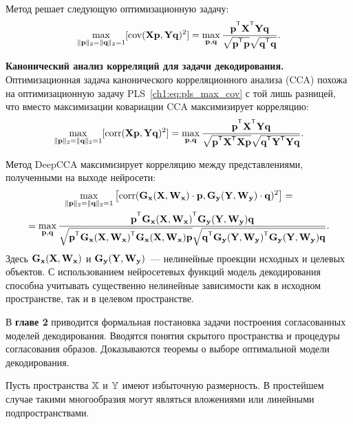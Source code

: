 \documentclass[11pt, a5paper]{dissert}
\begin{document}
Метод решает следующую оптимизационную задачу:
\begin{equation}
	\max_{\|\bp\|_{2}=\|\bq\|_{2}=1}[ \text{cov}(\bX \bp, \bY \bq)^{2}] = \max_{\bp, \bq} \frac{\bp^{\T} \bX^{\T} \bY \bq}{\sqrt{\bp^{\T} \bp} \sqrt{\bq^{\T} \bq}}.
	\label{ch1:eq:pls_max_cov}
\end{equation}

\vspace{0.5cm}
\textbf{Канонический анализ корреляций для задачи декодирования.}
Оптимизационная задача канонического корреляционного анализа (CCA) похожа на оптимизационную задачу PLS~\eqref{ch1:eq:pls_max_cov} с той лишь разницей, что вместо максимизации ковариации CCA максимизирует корреляцию:
\begin{equation}
	\max_{\|\bp\|_{2}=\|\bq\|_{2}=1}[ \text{corr}(\bX \bp, \bY \bq)^{2}] = \max_{\bp, \bq} \frac{\bp^{\T} \bX^{\T} \bY \bq}{\sqrt{\bp^{\T} \bX^{\T}  \bX \bp} \sqrt{\bq^{\T} \bY^{\T}  \bY\bq}}.
	\label{ch1:eq:cca_max_corr}
\end{equation}

Метод DeepCCA максимизирует корреляцию между представлениями, полученными на выходе нейросети:
\begin{multline}
	\max_{\|\bp\|_{2}=\|\bq\|_{2}=1}\left[ \text{corr}(\mathbf{G}_{\bx}(\bX, \bW_{\bx}) \cdot \bp, \mathbf{G}_{\by}(\bY, \bW_{\by}) \cdot \bq)^{2}\right] = \\ = \max_{\bp, \bq} \frac{\bp^{\T} \mathbf{G}_{\bx}(\bX, \bW_{\bx})^{\T} \mathbf{G}_{\by}(\bY, \bW_{\by}) \bq}{\sqrt{\bp^{\T} \mathbf{G}_{\bx}(\bX, \bW_{\bx})^{\T}  \mathbf{G}_{\bx}(\bX, \bW_{\bx}) \bp} \sqrt{\bq^{\T} \mathbf{G}_{\by}(\bY, \bW_{\by})^{\T}  \mathbf{G}_{\by}(\bY, \bW_{\by}) \bq}}.
	\label{ch1:eq:depp_cca_max_corr}
\end{multline}
Здесь $\mathbf{G}_{\mathbf{x}}(\mathbf{X}, \mathbf{W}_{\mathbf{x}})$ и $\mathbf{G}_{\mathbf{y}}(\mathbf{Y}, \mathbf{W}_{\mathbf{y}})$~--- нелинейные проекции исходных и целевых объектов.
С использованием нейросетевых функций модель декодирования способна учитывать существенно нелинейные зависимости как в исходном пространстве, так и в целевом пространстве.

В \textbf{главе 2} приводится формальная постановка задачи построения согласованных моделей декодирования. 
Вводятся понятия скрытого пространства и процедуры согласования образов.
Доказываются теоремы о выборе оптимальной модели декодирования.

\begin{assumption}
	Пусть пространства $\mathbb{X}$ и $\mathbb{Y}$ имеют избыточную размерность. 
	В простейшем случае такими многообразия могут являться вложениями или линейными подпространствами.
\end{assumption}
\end{document}
